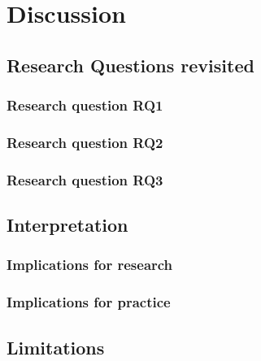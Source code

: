 \chapter{Discussion}
\label{chap:discuss}
\section{Research Questions revisited}
\subsection{Research question RQ1}
\subsection{Research question RQ2}
\subsection{Research question RQ3}

\section{Interpretation}
\subsection{Implications for research}
\subsection{Implications for practice}

\section{Limitations}

